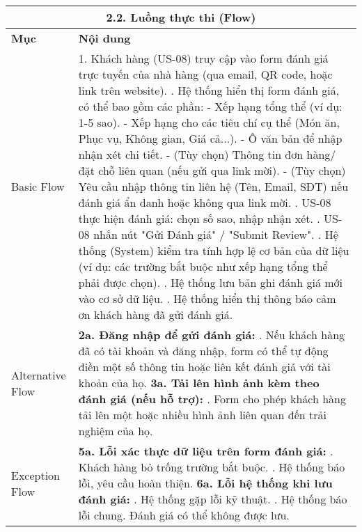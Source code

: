 \begin{longtable}{|m{4cm}|p{11cm}|}
\hline
\multicolumn{2}{|c|}{\textbf{2.2. Luồng thực thi (Flow)}} \\
\hline
\textbf{Mục} & \textbf{Nội dung} \\
\hline
Basic Flow & 1. Khách hàng (US-08) truy cập vào form đánh giá trực tuyến của nhà hàng (qua email, QR code, hoặc link trên website). \newline 2. Hệ thống hiển thị form đánh giá, có thể bao gồm các phần: \newline    - Xếp hạng tổng thể (ví dụ: 1-5 sao). \newline    - Xếp hạng cho các tiêu chí cụ thể (Món ăn, Phục vụ, Không gian, Giá cả...). \newline    - Ô văn bản để nhập nhận xét chi tiết. \newline    - (Tùy chọn) Thông tin đơn hàng/đặt chỗ liên quan (nếu gửi qua link mời). \newline    - (Tùy chọn) Yêu cầu nhập thông tin liên hệ (Tên, Email, SĐT) nếu đánh giá ẩn danh hoặc không qua link mời. \newline 3. US-08 thực hiện đánh giá: chọn số sao, nhập nhận xét. \newline 4. US-08 nhấn nút "Gửi Đánh giá" / "Submit Review". \newline 5. Hệ thống (System) kiểm tra tính hợp lệ cơ bản của dữ liệu (ví dụ: các trường bắt buộc như xếp hạng tổng thể phải được chọn). \newline 6. Hệ thống lưu bản ghi đánh giá mới vào cơ sở dữ liệu. \newline 7. Hệ thống hiển thị thông báo cảm ơn khách hàng đã gửi đánh giá. \\
\hline
Alternative Flow & \textbf{2a. Đăng nhập để gửi đánh giá:} \newline    1. Nếu khách hàng đã có tài khoản và đăng nhập, form có thể tự động điền một số thông tin hoặc liên kết đánh giá với tài khoản của họ. \newline \textbf{3a. Tải lên hình ảnh kèm theo đánh giá (nếu hỗ trợ):} \newline    1. Form cho phép khách hàng tải lên một hoặc nhiều hình ảnh liên quan đến trải nghiệm của họ. \\
\hline
Exception Flow & \textbf{5a. Lỗi xác thực dữ liệu trên form đánh giá:} \newline    1. Khách hàng bỏ trống trường bắt buộc. \newline    2. Hệ thống báo lỗi, yêu cầu hoàn thiện. \newline \textbf{6a. Lỗi hệ thống khi lưu đánh giá:} \newline    1. Hệ thống gặp lỗi kỹ thuật. \newline    2. Hệ thống báo lỗi chung. Đánh giá có thể không được lưu. \\

\end{longtable}
